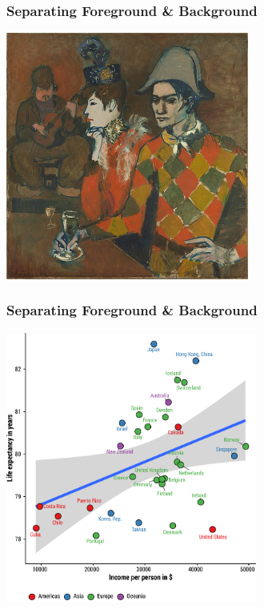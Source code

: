 \documentclass[hyperref={bookmarks=false}]{beamer}
\begin{document}

\begin{frame}
\frametitle{Separating Foreground \& Background}

\center\includegraphics[width = 0.6\textwidth]{./fig/picasso.jpg}


\end{frame}


\begin{frame}
\frametitle{Separating Foreground \& Background}

\center\includegraphics[width = 0.62\textwidth]{./fig/fb0.pdf}


\end{frame}
\end{document}
